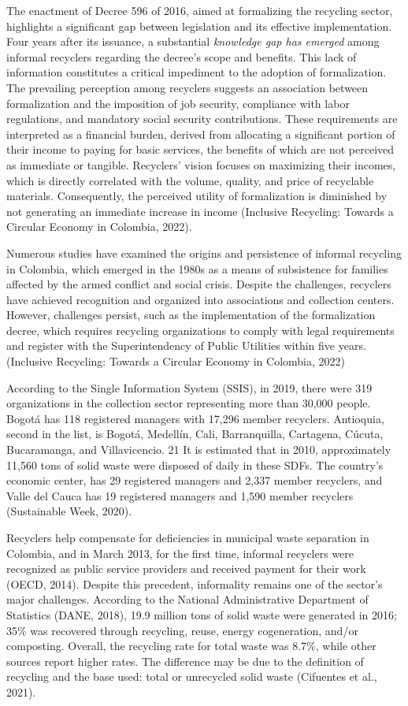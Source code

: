 \documentclass[
  12pt,
  oneside]{book}
\begin{document}
The enactment of Decree 596 of 2016, aimed at formalizing the recycling
sector, highlights a significant gap between legislation and its
effective implementation. Four years after its issuance, a substantial
\emph{knowledge gap has emerged }among informal recyclers regarding the
decree's scope and benefits. This lack of information constitutes a
critical impediment to the adoption of formalization. The prevailing
perception among recyclers suggests an association between formalization
and the imposition of job security, compliance with labor regulations,
and mandatory social security contributions. These requirements are
interpreted as a financial burden, derived from allocating a significant
portion of their income to paying for basic services, the benefits of
which are not perceived as immediate or tangible. Recyclers' vision
focuses on maximizing their incomes, which is directly correlated with
the volume, quality, and price of recyclable materials. Consequently,
the perceived utility of formalization is diminished by not generating
an immediate increase in income (Inclusive Recycling: Towards a Circular
Economy in Colombia, 2022).

Numerous studies have examined the origins and persistence of informal
recycling in Colombia, which emerged in the 1980s as a means of
subsistence for families affected by the armed conflict and social
crisis. Despite the challenges, recyclers have achieved recognition and
organized into associations and collection centers. However, challenges
persist, such as the implementation of the formalization decree, which
requires recycling organizations to comply with legal requirements and
register with the Superintendency of Public Utilities within five years.
(Inclusive Recycling: Towards a Circular Economy in Colombia, 2022)

According to the Single Information System (SSIS), in 2019, there were
319 organizations in the collection sector representing more than 30,000
people. Bogotá has 118 registered managers with 17,296 member recyclers.
Antioquia, second in the list, is Bogotá, Medellín, Cali, Barranquilla,
Cartagena, Cúcuta, Bucaramanga, and Villavicencio. 21 It is estimated
that in 2010, approximately 11,560 tons of solid waste were disposed of
daily in these SDFs. The country's economic center, has 29 registered
managers and 2,337 member recyclers, and Valle del Cauca has 19
registered managers and 1,590 member recyclers (Sustainable Week, 2020).

Recyclers help compensate for deficiencies in municipal waste separation
in Colombia, and in March 2013, for the first time, informal recyclers
were recognized as public service providers and received payment for
their work (OECD, 2014). Despite this precedent, informality remains one
of the sector's major challenges. According to the National
Administrative Department of Statistics (DANE, 2018), 19.9 million tons
of solid waste were generated in 2016; 35\% was recovered through
recycling, reuse, energy cogeneration, and/or composting. Overall, the
recycling rate for total waste was 8.7\%, while other sources report
higher rates. The difference may be due to the definition of recycling
and the base used: total or unrecycled solid waste (Cifuentes et al.,
2021).
\end{document}
